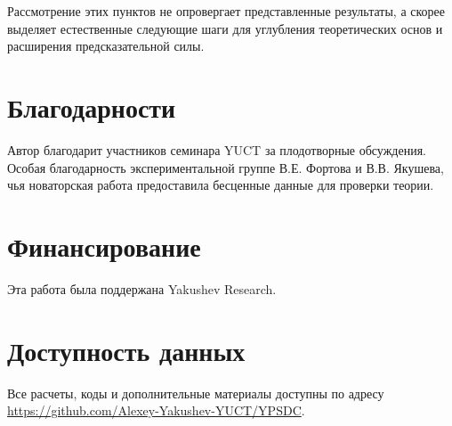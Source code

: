 \documentclass[12pt,a4paper]{article}
\theoremstyle{remark}
\begin{document}
	Рассмотрение этих пунктов не опровергает представленные результаты, а скорее выделяет естественные следующие шаги для углубления теоретических основ и расширения предсказательной силы.
	
	
	\section*{Благодарности}
	
	Автор благодарит участников семинара YUCT за плодотворные обсуждения. Особая благодарность экспериментальной группе В.Е. Фортова и В.В. Якушева, чья новаторская работа предоставила бесценные данные для проверки теории.
	
	\section*{Финансирование}
	
	Эта работа была поддержана Yakushev Research.
	
	\section*{Доступность данных}
	
	Все расчеты, коды и дополнительные материалы доступны по адресу \url{https://github.com/Alexey-Yakushev-YUCT/YPSDC}.
	
\end{document}
